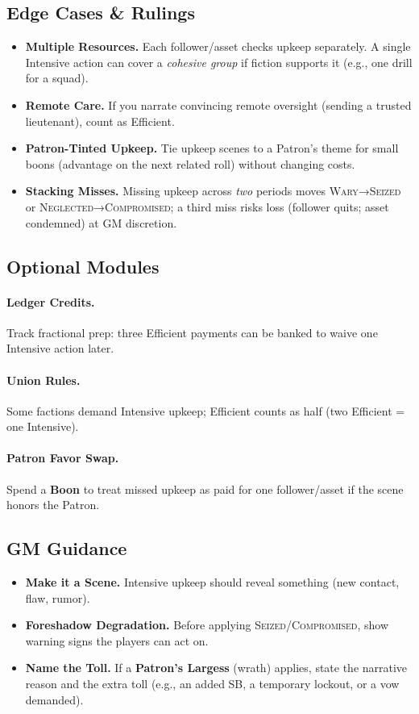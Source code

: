 \subsection{Edge Cases & Rulings}\label{subsec:upkeep-edge}
\begin{itemize}
\item \textbf{Multiple Resources.} Each follower/asset checks upkeep separately. A single Intensive action can cover a \emph{cohesive group} if fiction supports it (e.g., one drill for a squad).
\item \textbf{Remote Care.} If you narrate convincing remote oversight (sending a trusted lieutenant), count as Efficient.
\item \textbf{Patron-Tinted Upkeep.} Tie upkeep scenes to a Patron’s theme for small boons (advantage on the next related roll) without changing costs.
\item \textbf{Stacking Misses.} Missing upkeep across \emph{two} periods moves \textsc{Wary}→\textsc{Seized} or \textsc{Neglected}→\textsc{Compromised}; a third miss risks loss (follower quits; asset condemned) at GM discretion.
\end{itemize}

\subsection{Optional Modules}\label{subsec:upkeep-modules}
\paragraph{Ledger Credits.} Track fractional prep: three Efficient payments can be banked to waive one Intensive action later.
\paragraph{Union Rules.} Some factions demand Intensive upkeep; Efficient counts as half (two Efficient = one Intensive).
\paragraph{Patron Favor Swap.} Spend a \textbf{Boon} to treat missed upkeep as paid for one follower/asset if the scene honors the Patron.

\subsection{GM Guidance}\label{subsec:upkeep-gm}
\begin{itemize}
\item \textbf{Make it a Scene.} Intensive upkeep should reveal something (new contact, flaw, rumor).
\item \textbf{Foreshadow Degradation.} Before applying \textsc{Seized}/\textsc{Compromised}, show warning signs the players can act on.
\item \textbf{Name the Toll.} If a \textbf{Patron’s Largess} (wrath) applies, state the narrative reason and the extra toll (e.g., an added SB, a temporary lockout, or a vow demanded).
\end{itemize}

